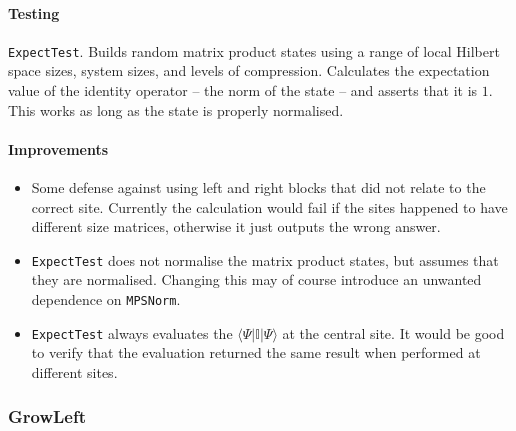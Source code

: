  \paragraph{Testing} \lstinline$ExpectTest$. Builds random matrix product states using a range of local Hilbert space sizes, system sizes, and levels of compression. Calculates the expectation value of the identity operator -- the norm of the state -- and asserts that it is \(1\). This works as long as the state is properly normalised.
 \paragraph{Improvements}
 \begin{itemize}
 \item Some defense against using left and right blocks that did not relate to the correct site. Currently the calculation would fail if the sites happened to have different size matrices, otherwise it just outputs the wrong answer.
 \item \lstinline$ExpectTest$ does not normalise the matrix product states, but assumes that they are normalised. Changing this may of course introduce an unwanted dependence on \lstinline$MPSNorm$. 
 \item \lstinline$ExpectTest$ always evaluates the \(\langle \Psi | \mathbb{I} | \Psi \rangle\) at the central site. It would be good to verify that the evaluation returned the same result when performed at different sites.
 \end{itemize} 
 
 \subsubsection{GrowLeft}
